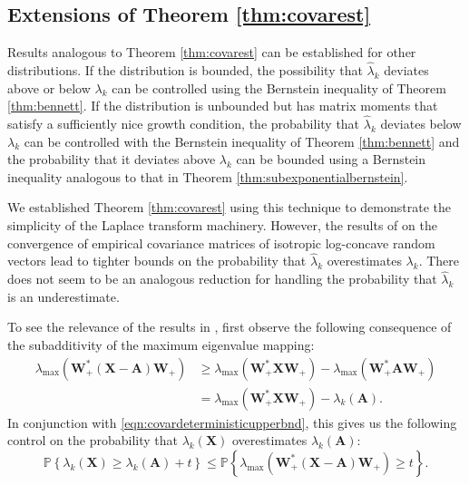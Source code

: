 \documentclass[11pt,letterpaper,twoside,reqno,nosumlimits]{amsart}
\renewcommand{\star}{*}
\newcommand{\mat}[1]{\ensuremath{\bm{#1}}} %
\newcommand{\Prob}[1]{\ensuremath{\mathbb{P}\left\{#1\right\}}}
\newcommand{\lambdamax}[1]{\ensuremath{\lambda_{\mathrm{max}}\left(#1\right)}}
\theoremstyle{remark}
\numberwithin{equation}{section}
\numberwithin{thm}{section}
\numberwithin{prop}{section}
\numberwithin{defn}{section}
\numberwithin{remark}{section}
\begin{document}
\subsection{Extensions of Theorem \ref{thm:covarest}}
Results analogous to Theorem \ref{thm:covarest} can be established for other distributions. If the distribution is bounded, the possibility that $\hat{\lambda}_k$ deviates above or below $\lambda_k$ can be controlled using the Bernstein inequality of Theorem \ref{thm:bennett}. If the distribution is unbounded but has matrix moments that satisfy a sufficiently nice growth condition, the probability that $\hat{\lambda}_k$ deviates below $\lambda_k$ can be controlled with the Bernstein inequality of Theorem \ref{thm:bennett} and the probability that it deviates above $\lambda_k$ can be bounded using a Bernstein inequality analogous to that in Theorem \ref{thm:subexponentialbernstein}.

We established Theorem \ref{thm:covarest} using this technique to demonstrate the simplicity of the Laplace transform machinery. However, the results of \cite{ALPT10b} on the convergence of empirical covariance matrices of isotropic log-concave random vectors lead to tighter bounds on the probability that $\hat{\lambda}_k$ overestimates $\lambda_k.$ There does not seem to be an analogous reduction for handling the probability that $\hat{\lambda}_k$ is an underestimate.

To see the relevance of the results in \cite{ALPT10b}, first observe the following consequence of the subadditivity of the maximum eigenvalue mapping:
\begin{align*}
\lambdamax{\mat{W}_+^\star(\mat{X} - \mat{A}) \mat{W}_+} & \geq \lambdamax{\mat{W}_+^\star \mat{X} \mat{W}_+} - \lambdamax{\mat{W}_+^\star \mat{A} \mat{W}_+} \\
 &= \lambdamax{\mat{W}_+^\star \mat{X} \mat{W}_+} - \lambda_k(\mat{A}).
\end{align*}
In conjunction with \eqref{eqn:covardeterministicupperbnd}, this gives us the following control on the probability that $\lambda_k(\mat{X})$ overestimates $\lambda_k(\mat{A}):$ 
\[
 \Prob{\lambda_k(\mat{X}) \geq \lambda_k(\mat{A}) + t} \leq \Prob{\lambdamax{\mat{W}_+^\star (\mat{X} - \mat{A}) \mat{W}_+} \geq t}.
\]
\end{document}
